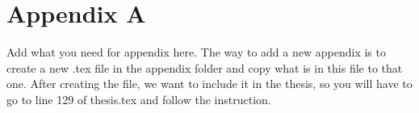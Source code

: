 \vspace{5.08cm}
\chapter*{\centering Appendix A} %

Add what you need for appendix here. The way to add a new appendix is to create a new .tex file in the appendix folder and copy what is in this file to that one. After creating the file, we want to include it in the thesis, so you will have to go to line 129 of thesis.tex and follow the instruction.